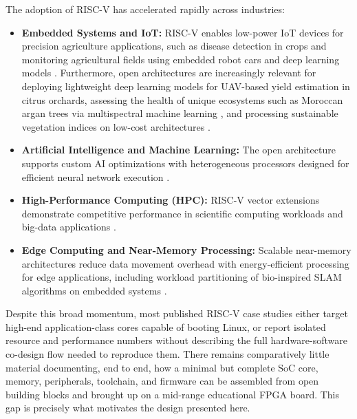 \documentclass[runningheads]{llncs}
\begin{document}
The adoption of RISC-V has accelerated rapidly across industries:
\begin{itemize}
\item \textbf{Embedded Systems and IoT:} RISC-V enables low-power IoT devices for precision agriculture applications, such as disease detection in crops and monitoring agricultural fields using embedded robot cars and deep learning models \cite{saddik2024yolo,saddik2024tomato}. Furthermore, open architectures are increasingly relevant for deploying lightweight deep learning models for UAV-based yield estimation in citrus orchards\cite{saddik_uav}, assessing the health of unique ecosystems such as Moroccan argan trees via multispectral machine learning \cite{saddik_assessing}, and processing sustainable vegetation indices on low-cost architectures \cite{saddik_sus}.

\item \textbf{Artificial Intelligence and Machine Learning:} The open architecture supports custom AI optimizations with heterogeneous processors designed for efficient neural network execution \cite{kalapothas2023survey,caon2024heterogeneous}.

\item \textbf{High-Performance Computing (HPC):} RISC-V vector extensions demonstrate competitive performance in scientific computing workloads and big-data applications \cite{brown2023test,authors2023risc}.

\item \textbf{Edge Computing and Near-Memory Processing:} Scalable near-memory architectures reduce data movement overhead with energy-efficient processing for edge applications, including workload partitioning of bio-inspired SLAM algorithms on embedded systems \cite{caon2024scalable,adaptive2024energy,saddik2021slam}.
\end{itemize}

Despite this broad momentum, most published RISC-V case studies either target high-end application-class cores capable of booting Linux, or report isolated resource and performance numbers without describing the full hardware-software co-design flow needed to reproduce them. There remains comparatively little material documenting, end to end, how a minimal but complete SoC  core, memory, peripherals, toolchain, and firmware  can be assembled from open building blocks and brought up on a mid-range educational FPGA board. This gap is precisely what motivates the design presented here.
\end{document}
